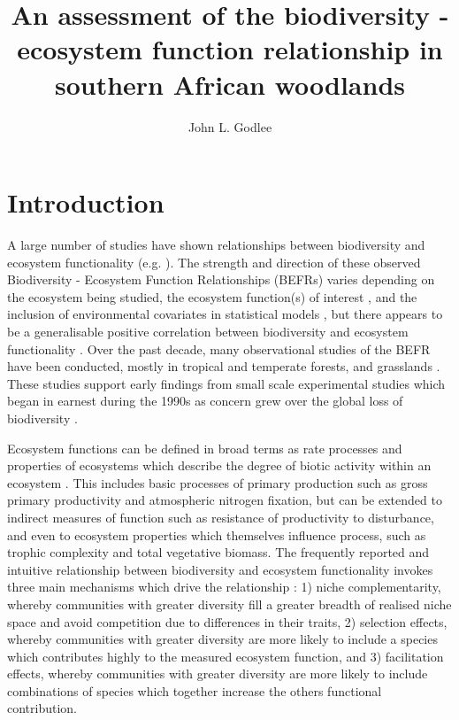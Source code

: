 \documentclass[11pt,a4paper]{article}
\title{An assessment of the biodiversity - ecosystem function relationship in southern African woodlands}
\author{John L. Godlee}
\date{}
\begin{document}
\maketitle
\tableofcontents

\section{Introduction}

A large number of studies have shown relationships between biodiversity and ecosystem functionality (e.g. \citealt{Liang2016, Cardinale2009}). The strength and direction of these observed Biodiversity - Ecosystem Function Relationships (BEFRs) varies depending on the ecosystem being studied, the ecosystem function(s) of interest \citep{Hector2007}, and the inclusion of environmental covariates in statistical models \citep{Vila2005}, but there appears to be a generalisable positive correlation between biodiversity and ecosystem functionality \citep{Liang2016}. Over the past decade, many observational studies of the BEFR have been conducted, mostly in tropical and temperate forests, and grasslands \citep{Chen2011}. These studies support early findings from small scale experimental studies which began in earnest during the 1990s as concern grew over the global loss of biodiversity \citep{Tilman1994, Tilman2014}.

Ecosystem functions can be defined in broad terms as rate processes and properties of ecosystems which describe the degree of biotic activity within an ecosystem \citep{Jax2005}. This includes basic processes of primary production such as gross primary productivity and atmospheric nitrogen fixation, but can be extended to indirect measures of function such as resistance of productivity to disturbance, and even to ecosystem properties which themselves influence process, such as trophic complexity and total vegetative biomass. The frequently reported and intuitive relationship between biodiversity and ecosystem functionality invokes three main mechanisms which drive the relationship \citep{Tilman2014}: 1) niche complementarity, whereby communities with greater diversity fill a greater breadth of realised niche space and avoid competition due to differences in their traits, 2) selection effects, whereby communities with greater diversity are more likely to include a species which contributes highly to the measured ecosystem function, and 3) facilitation effects, whereby communities with greater diversity are more likely to include combinations of species which together increase the others functional contribution.
\end{document}
